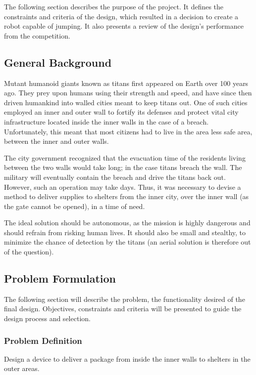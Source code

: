 \documentclass[ece]{uw-wkrpt}
\begin{document}
The following section describes the purpose of the project. It defines the constraints and criteria of the design, which resulted in a decision to create a robot capable of jumping. It also presents a review of the design’s performance from the competition. 


\subsection{General Background}

Mutant humanoid giants known as titans first appeared on Earth over 100 years ago. They prey upon humans using their strength and speed, and have since then driven humankind into walled cities meant to keep titans out. One of such cities employed an inner and outer wall to fortify its defenses and protect vital city infrastructure located inside the inner walls in the case of a breach. Unfortunately, this meant that most citizens had to live in the area less safe area, between the inner and outer walls.

The city government recognized that the evacuation time of the residents living between the two walls would take long; in the case titans breach the wall. The military will eventually contain the breach and drive the titans back out. However, such an operation may take days. Thus, it was necessary to devise a method to deliver supplies to shelters from the inner city, over the inner wall (as the gate cannot be opened), in a time of need.

The ideal solution should be autonomous, as the mission is highly dangerous and should refrain from risking human lives. It should also be small and stealthy, to minimize the chance of detection by the titans (an aerial solution is therefore out of the question).


\subsection{Problem Formulation}

The following section will describe the problem, the functionality desired of the final design. Objectives, constraints and criteria will be presented to guide the design process and selection.

\subsubsection{Problem Definition}

Design a device to deliver a package from inside the inner walls to shelters in the outer areas.
\end{document}
